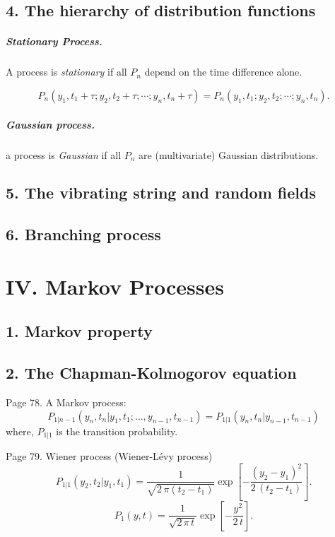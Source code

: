 \documentclass{book}
\begin{document}
\section{4. The hierarchy of distribution functions}

\paragraph{Stationary Process.}

A process is \emph{stationary} if all $P_n$ depend on the time difference alone.

$$
P_n(y_1, t_1 + \tau; y_2, t_2 + \tau; \cdots; y_n, t_n + \tau)
=
P_n(y_1, t_1; y_2, t_2; \cdots; y_n, t_n).
$$


\paragraph{Gaussian process.}

a process is \emph{Gaussian} if all $P_n$ are
(multivariate) Gaussian distributions.


\section{5. The vibrating string and random fields}

\section{6. Branching process}


\chapter{IV. Markov Processes}


\section{1. Markov property}

\section{2. The Chapman-Kolmogorov equation}

Page 78.
A Markov process:
$$
P_{1|n-1}(y_n, t_n| y_1, t_1; \dots, y_{n-1}, t_{n-1})
=
P_{1|1}(y_n, t_n|y_{n-1},t_{n-1})
$$
where, $P_{1|1}$ is the transition probability.

Page 79.
Wiener process (Wiener-L\'evy process)
\begin{equation}
P_{1|1}(y_2, t_2|y_1, t_1)
=
\frac{1}{\sqrt{2\,\pi(t_2 - t_1)}}
\exp\left[
  -\frac{ (y_2 - y_1)^2 } { 2 \, (t_2 - t_1) }
\right].
\tag{2.4}
\end{equation}
%
\begin{equation}
P_1(y, t)
=
\frac{1}{\sqrt{2\,\pi\,t}}
\exp\left[
  -\frac{ y^2 } { 2 \, t }
\right].
\tag{2.5}
\end{equation}
\end{document}
